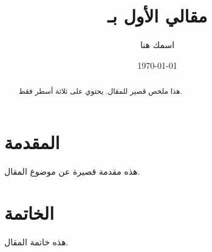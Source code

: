 ﻿\documentclass{article}
\title{مقالي الأول بـ \LR{LaTeX}}
\author{اسمك هنا}
\date{\today}
\begin{document}
\maketitle
\begin{abstract}
هذا ملخص قصير للمقال. يحتوي على ثلاثة أسطر فقط.
\end{abstract}
\section{المقدمة}
هذه مقدمة قصيرة عن موضوع المقال.
\section{الخاتمة}
هذه خاتمة المقال.
\end{document}
